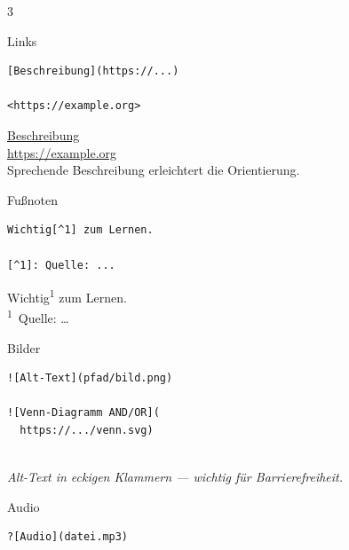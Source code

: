 \documentclass[a4paper,landscape,9pt]{extarticle}
\newcommand{\prevtxt}[1]{{\small #1}}
\begin{document}
\begin{multicols}{3}

\begin{mdcard}{Links}
\begin{lstlisting}[language=lia]
[Beschreibung](https://...)

<https://example.org>
\end{lstlisting}
\tcblower
\prevtxt{\textcolor{mdblue}{\underline{Beschreibung}}\\[2pt]
\textcolor{mdblue}{\underline{https://example.org}}\\[3pt]
{\scriptsize\color{muted}Sprechende Beschreibung erleichtert die Orientierung.}}
\end{mdcard}

\begin{mdcard}{Fußnoten}
\begin{lstlisting}[language=lia]
Wichtig[^1] zum Lernen.

[^1]: Quelle: ...
\end{lstlisting}
\tcblower
\prevtxt{Wichtig\textsuperscript{\textcolor{mdblue}{1}} zum Lernen.\\[3pt]
{\scriptsize \textsuperscript{1}~Quelle: \dots}}
\end{mdcard}

\begin{mdcard}{Bilder}
\begin{lstlisting}[language=lia]
![Alt-Text](pfad/bild.png)

![Venn-Diagramm AND/OR](
  https://.../venn.svg)
\end{lstlisting}
\tcblower
\prevtxt{\fbox{\rule{0pt}{1.2em}\hspace{1.2em}{\scriptsize\color{muted}Bild}\hspace{1.2em}}\\[2pt]
{\scriptsize\color{muted}\textit{Alt-Text in eckigen Klammern — wichtig für Barrierefreiheit.}}}
\end{mdcard}

\begin{mdcard}{Audio}
\begin{lstlisting}[language=lia]
?[Audio](datei.mp3)


\end{lstlisting}
\end{mdcard}
\end{multicols}
\end{document}
